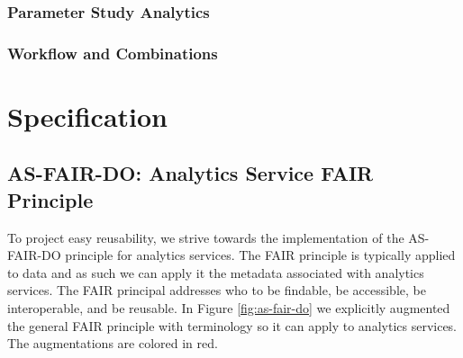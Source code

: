 \documentclass[12pt]{article}
\begin{document}
\subsubsection{Parameter Study Analytics}
\subsubsection{Workflow and Combinations}






\section{Specification}


\subsection{AS-FAIR-DO: Analytics Service FAIR Principle}

To project easy reusability, we strive towards the implementation of the AS-FAIR-DO principle for analytics services. The FAIR principle is typically applied to data and as such we can apply it the metadata associated with analytics services. The FAIR principal addresses who to be findable, be accessible, be interoperable, and be reusable. In Figure \ref{fig:as-fair-do} we explicitly augmented the general FAIR principle with terminology so it can apply to analytics services. The augmentations are colored in red.
\end{document}
